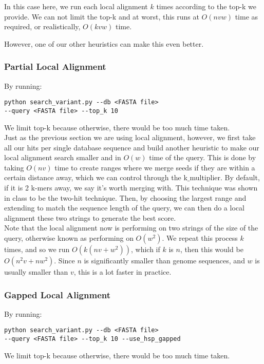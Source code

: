 \documentclass[10pt]{article}
\begin{document}
In this case here, we run each local alignment $k$ times according to the top-k we provide. We can not limit the top-k and at worst, this runs at $O(nvw)$ time as required, or realistically, $O(kvw)$ time.

However, one of our other heuristics can make this even better.

\subsubsection*{Partial Local Alignment}
By running:
\begin{lstlisting}
python search_variant.py --db <FASTA file> 
--query <FASTA file> --top_k 10
\end{lstlisting}
We limit top-k because otherwise, there would be too much time taken.\\

Just as the previous section we are using local alignment, however, we first take all our hits per single database sequence and build another heuristic to make our local alignment search smaller and in $O(w)$ time of the query. This is done by taking $O(nv)$ time to create ranges where we merge seeds if they are within a certain distance away, which we can control through the k$\_$multiplier. By default, if it is 2 k-mers away, we say it's worth merging with. This technique was shown in class to be the two-hit technique. Then, by choosing the largest range and extending to match the sequence length of the query, we can then do a local alignment these two strings to generate the best score.\\

Note that the local alignment now is performing on two strings of the size of the query, otherwise known as performing on $O(w^2)$. We repeat this process $k$ times, and so we run $O(k(nv + w^2))$, which if $k$ is $n$, then this would be $O(n^2v + nw^2)$. Since $n$ is significantly smaller than genome sequences, and $w$ is usually smaller than $v$, this is a lot faster in practice.

\subsubsection*{Gapped Local Alignment}
By running:
\begin{lstlisting}
python search_variant.py --db <FASTA file> 
--query <FASTA file> --top_k 10 --use_hsp_gapped
\end{lstlisting}
We limit top-k because otherwise, there would be too much time taken.\\
\end{document}
